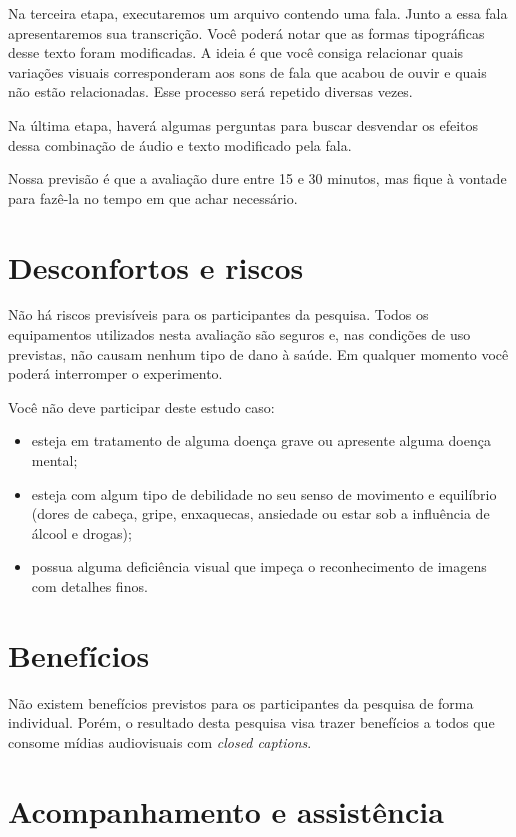 \documentclass[a4paper,11pt,titlepage,singlespacing]{article}
\begin{document}
Na terceira etapa, executaremos um arquivo contendo uma fala. Junto a essa fala apresentaremos sua transcrição. Você poderá notar que as formas tipográficas desse texto foram modificadas. A ideia é que você consiga relacionar quais variações visuais corresponderam aos sons de fala que acabou de ouvir e quais não estão relacionadas. Esse processo será repetido diversas vezes.

Na última etapa, haverá algumas perguntas para buscar desvendar os efeitos dessa combinação de áudio e texto modificado pela fala.

Nossa previsão é que a avaliação dure entre 15 e 30 minutos, mas fique à vontade para fazê-la no tempo em que achar necessário.



\section*{Desconfortos e riscos}

\noindent Não há riscos previsíveis para os participantes da pesquisa. Todos os equipamentos utilizados nesta avaliação são seguros e, nas condições de uso previstas, não causam nenhum tipo de dano à saúde. Em qualquer momento você poderá interromper o experimento.

Você não deve participar deste estudo caso:

\begin{itemize}
\item esteja em tratamento de alguma doença grave ou apresente alguma doença mental;
\item esteja com algum tipo de debilidade no seu senso de movimento e equilíbrio (dores de cabeça, gripe, enxaquecas, ansiedade ou estar sob a influência de álcool e drogas);
\item possua alguma deficiência visual que impeça o reconhecimento de imagens com detalhes finos.
\end{itemize}

\section*{Benefícios}

\noindent Não existem benefícios previstos para os participantes da pesquisa de forma individual. Porém, o resultado desta pesquisa visa trazer benefícios a todos que consome mídias audiovisuais com \textit{closed captions}.

\section*{Acompanhamento e assistência}
\end{document}
